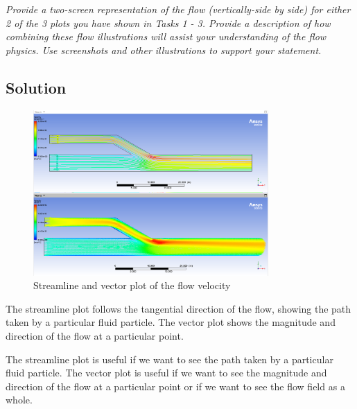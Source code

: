 
\section{}
\textit{Provide a two-screen representation of the flow (vertically-side by side) for either 2 of the 3 plots you have shown in Tasks 1 - 3. Provide a description of how combining these flow illustrations will assist your understanding of the flow physics. Use screenshots and other illustrations to support your statement.}

\subsection*{Solution}
\begin{figure}[h]
    \centering
    \includegraphics[width=0.8\textwidth]{Questions/Figures/velocity streamline and vector.png}
    \caption{Streamline and vector plot of the flow velocity}
    \label{fig:contour}
\end{figure}

The streamline plot follows the tangential direction of the flow, showing the path taken by a particular fluid particle. The vector plot shows the magnitude and direction of the flow at a particular point. 

The streamline plot is useful if we want to see the path taken by a particular fluid particle. The vector plot is useful if we want to see the magnitude and direction of the flow at a particular point or if we want to see the flow field as a whole.